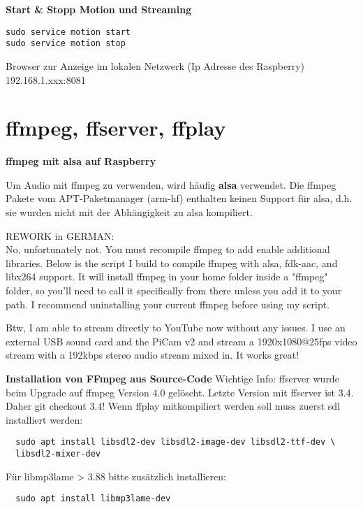 \textbf{Start \& Stopp Motion und Streaming}
\begin{verbatim}
sudo service motion start
sudo service motion stop
\end{verbatim}
Browser zur Anzeige im lokalen Netzwerk (Ip Adresse des Raspberry)\\
192.168.1.xxx:8081

\section{ffmpeg, ffserver, ffplay}
\textbf{ffmpeg mit alsa auf Raspberry }

Um Audio mit ffmpeg zu verwenden, wird häufig \textbf{alsa} verwendet. Die ffmpeg Pakete vom APT-Paketmanager (arm-hf) enthalten keinen Support für alsa, d.h. sie wurden nicht mit der Abhängigkeit zu alsa kompiliert.
   
REWORK in GERMAN:\\
No, unfortunately not. You must recompile ffmpeg to add enable additional libraries. Below is the script I build to compile ffmpeg with alsa, fdk-aac, and libx264 support. It will install ffmpeg in your home folder inside a "ffmpeg" folder, so you'll need to call it specifically from there unless you add it to your path. I recommend uninstalling your current ffmpeg before using my script.

Btw, I am able to stream directly to YouTube now without any issues. I use an external USB sound card and the PiCam v2 and stream a 1920x1080@25fps video stream with a 192kbps stereo audio stream mixed in. It works great!

\textbf{Installation von FFmpeg aus Source-Code}
Wichtige Info: ffserver wurde beim Upgrade auf ffmpeg Version 4.0 gelöscht. Letzte Version mit ffserver ist 3.4. Daher git checkout 3.4! Wenn ffplay mitkompiliert werden soll muss zuerst sdl installiert werden:
\begin{verbatim}
  sudo apt install libsdl2-dev libsdl2-image-dev libsdl2-ttf-dev \
  libsdl2-mixer-dev
\end{verbatim}

Für libmp3lame > 3.88 bitte zusätzlich installieren:
\begin{verbatim}
  sudo apt install libmp3lame-dev
\end{verbatim}

